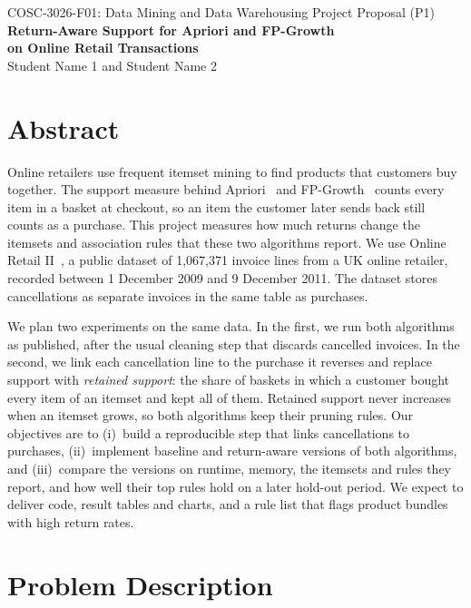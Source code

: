 \documentclass[11pt,a4paper]{article}
\begin{document}
\begin{center}
{\small COSC-3026-F01: Data Mining and Data Warehousing \quad Project Proposal (P1)}\\[6pt]
{\Large\bfseries Return-Aware Support for Apriori and FP-Growth\\[2pt] on Online Retail Transactions}\\[8pt]
Student Name 1 \quad and \quad Student Name 2
\end{center}

\section*{Abstract}

Online retailers use frequent itemset mining to find products that customers buy together. The support measure behind Apriori~\cite{agrawal1994} and FP-Growth~\cite{han2000} counts every item in a basket at checkout, so an item the customer later sends back still counts as a purchase. This project measures how much returns change the itemsets and association rules that these two algorithms report. We use Online Retail II~\cite{uci_oretail2}, a public dataset of 1,067,371 invoice lines from a UK online retailer, recorded between 1 December 2009 and 9 December 2011. The dataset stores cancellations as separate invoices in the same table as purchases.

We plan two experiments on the same data. In the first, we run both algorithms as published, after the usual cleaning step that discards cancelled invoices. In the second, we link each cancellation line to the purchase it reverses and replace support with \emph{retained support}: the share of baskets in which a customer bought every item of an itemset and kept all of them. Retained support never increases when an itemset grows, so both algorithms keep their pruning rules. Our objectives are to (i)~build a reproducible step that links cancellations to purchases, (ii)~implement baseline and return-aware versions of both algorithms, and (iii)~compare the versions on runtime, memory, the itemsets and rules they report, and how well their top rules hold on a later hold-out period. We expect to deliver code, result tables and charts, and a rule list that flags product bundles with high return rates.

\section*{Problem Description}
\end{document}
